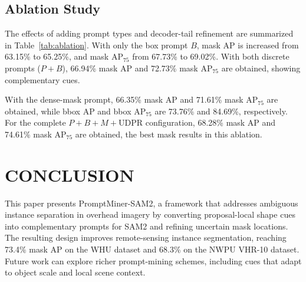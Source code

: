 \documentclass{article}
\begin{document}
\subsection{Ablation Study}
\vspace{-0.35em}
The effects of adding prompt types and decoder-tail refinement
are summarized in Table~\ref{tab:ablation}. With only the box
prompt $B$, mask AP is increased from 63.15\% to 65.25\%, and mask AP$_{75}$
from 67.73\% to 69.02\%. With both discrete prompts ($P{+}B$), 66.94\% mask
AP and 72.73\% mask AP$_{75}$ are obtained, showing complementary cues.

With the dense-mask prompt, 66.35\% mask AP and 71.61\% mask AP$_{75}$ are
obtained, while bbox AP and bbox AP$_{75}$ are 73.76\% and 84.69\%,
respectively. For the complete $P{+}B{+}M{+}\mathrm{UDPR}$ configuration,
68.28\% mask AP and 74.61\% mask AP$_{75}$ are obtained, the best mask
results in this ablation.

\section{CONCLUSION}
This paper presents PromptMiner-SAM2, a framework that addresses ambiguous
instance separation in overhead imagery by converting proposal-local shape cues
into complementary prompts for SAM2 and refining uncertain mask locations. The
resulting design improves remote-sensing instance segmentation, reaching 73.4\%
mask AP on the WHU dataset and 68.3\% on the NWPU VHR-10 dataset. Future work
can explore richer prompt-mining schemes, including cues that adapt to object
scale and local scene context.
\end{document}
